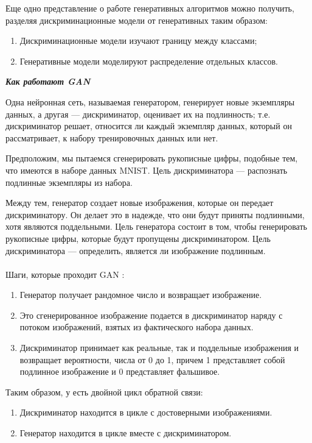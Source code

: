 \documentclass{article}
\begin{document}
Еще одно представление о работе генеративных алгоритмов можно получить, разделяя дискриминационные модели от генеративных таким образом:
\begin{enumerate} 
\item Дискриминационные модели изучают границу между классами;
\item Генеративные модели моделируют распределение отдельных классов.
\end{enumerate}
\textbf{\textit{Как работают GAN}}

Одна нейронная сеть, называемая генератором, генерирует новые экземпляры данных, а другая — дискриминатор, оценивает их на подлинность; т.е. дискриминатор решает, относится ли каждый экземпляр данных, который он рассматривает, к набору тренировочных данных или нет.

Предположим, мы пытаемся сгенерировать рукописные цифры, подобные тем, что имеются в наборе данных MNIST. Цель дискриминатора — распознать подлинные экземпляры из набора.

Между тем, генератор создает новые изображения, которые он передает дискриминатору. Он делает это в надежде, что они будут приняты подлинными, хотя являются поддельными. Цель генератора состоит в том, чтобы генерировать рукописные цифры, которые будут пропущены дискриминатором. Цель дискриминатора — определить, является ли изображение подлинным. \\ \\
Шаги, которые проходит GAN :
\begin{enumerate} 
\item Генератор получает рандомное число и возвращает изображение.
\item Это сгенерированное изображение подается в дискриминатор наряду с потоком изображений, взятых из фактического набора данных.
\item Дискриминатор принимает как реальные, так и поддельные изображения и возвращает вероятности, числа от 0 до 1, причем 1 представляет собой подлинное изображение и 0 представляет фальшивое. \\
\end{enumerate}
Таким образом, у есть двойной цикл обратной связи:
\begin{enumerate} 
\item Дискриминатор находится в цикле с достоверными изображениями.
\item Генератор находится в цикле вместе с дискриминатором.
\end{enumerate}
\end{document}
